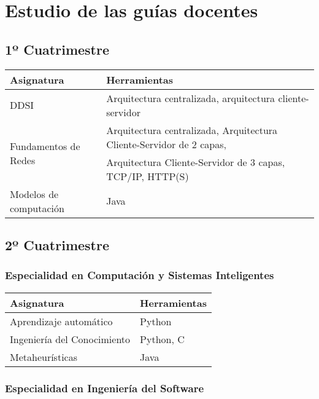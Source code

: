\chapter{Estudio de las guías docentes}
\section{1º Cuatrimestre}

\begin{center}
	\begin{tabular}{l|l}
		\textbf{Asignatura}    & \textbf{Herramientas} \\ \hline
		DDSI                   & Arquitectura centralizada, arquitectura cliente-servidor \\
		\multirow{2}{*}{Fundamentos de Redes} & Arquitectura centralizada, Arquitectura Cliente-Servidor de 2 capas,\\
		                                      & Arquitectura Cliente-Servidor de 3 capas, TCP/IP, HTTP(S)\\
		Modelos de computación & Java
	\end{tabular}
\end{center}

\section{2º Cuatrimestre}
\subsection{Especialidad en Computación y Sistemas Inteligentes}

\begin{center}
	\begin{tabular}{l|l}
		\textbf{Asignatura}         & \textbf{Herramientas} \\ \hline
		Aprendizaje automático      & Python \\
		Ingeniería del Conocimiento & Python, C\\
		Metaheurísticas             & Java
	\end{tabular}
\end{center}

\subsection{Especialidad en Ingeniería del Software}

